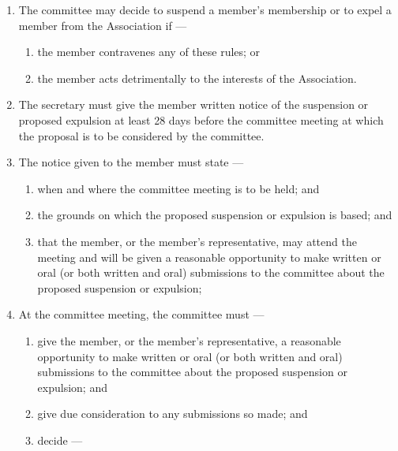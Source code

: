 \begin{enumerate}

\item The committee may decide to suspend a member's membership or to expel a member from the Association if ---

  \begin{enumerate}
  
  \item the member contravenes any of these rules; or
  \item the member acts detrimentally to the interests of the Association.
  \end{enumerate}
\item The secretary must give the member written notice of the suspension or proposed expulsion at least 28 days before the committee meeting at which the proposal is to be considered by the committee.
\item The notice given to the member must state ---

  \begin{enumerate}
  
  \item when and where the committee meeting is to be held; and
  \item the grounds on which the proposed suspension or expulsion is based; and
  \item that the member, or the member's representative, may attend the meeting and will be given a reasonable opportunity to make written or oral (or both written and oral) submissions to the committee about the proposed suspension or expulsion;
  \end{enumerate}
\item At the committee meeting, the committee must ---

  \begin{enumerate}
  
  \item give the member, or the member's representative, a reasonable opportunity to make written or oral (or both written and oral) submissions to the committee about the proposed suspension or expulsion; and
  \item give due consideration to any submissions so made; and
  \item decide ---

    \begin{enumerate}
    

\end{enumerate}
\end{enumerate}
\end{enumerate}
